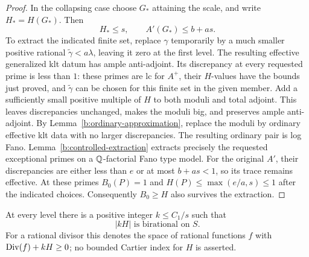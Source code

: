 \begin{proof}
In the collapsing case choose $G_*$ attaining the scale, and write
$H_*=H(G_*)$.  Then
\[
                H_*\le s,\qquad A'(G_*)\le b+as.
\]
To extract the indicated finite set, replace $\gamma$ temporarily by
a much smaller positive rational $\widetilde\gamma<a\lambda$,
leaving it zero at the first level.  The resulting effective generalized
klt datum has ample anti-adjoint.  Its discrepancy at every requested
prime is less than $1$: these primes are lc for $A^+$, their
$H$-values have the bounds just proved, and
$\widetilde\gamma$ can be chosen for this finite set in the given
member.  Add a sufficiently small positive multiple of $H$ to both
moduli and total adjoint.  This leaves discrepancies unchanged, makes
the moduli big, and preserves ample anti-adjoint.  By
Lemma~\ref{b:ordinary-approximation}, replace the moduli by ordinary
effective klt data with no larger discrepancies.  The resulting
ordinary pair is log Fano.  Lemma~\ref{b:controlled-extraction}
extracts precisely the requested exceptional primes on a
$\mathbb Q$-factorial Fano type model.
For the original $A'$, their discrepancies are either less than $e$
or at most $b+as<1$, so its trace remains effective.  At these primes
$B_0(P)=1$ and $H(P)\le\max(e/a,s)\le1$ after the indicated choices.
Consequently $B_0\ge H$ also survives the extraction.
\end{proof}

\begin{lemma}\label{b:scale-birationality}
At every level there is a positive integer $k\le C_1/s$ such that
\begin{equation}\label{eq:B3}
                         |kH|\text{ is birational on }S.
\end{equation}
For a rational divisor this denotes the space of rational functions
$f$ with $\operatorname{Div}(f)+kH\ge0$; no bounded Cartier index for $H$ is asserted.
\end{lemma}

